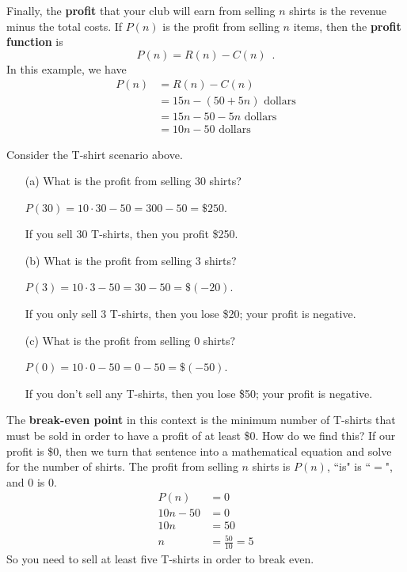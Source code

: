 Finally, the {\bf profit} that your club will earn from selling $n$ shirts is the revenue minus the total costs. If $P(n)$ is the profit from selling $n$ items, then the {\bf profit function} is
$$P(n) = R(n) - C(n) \enspace .$$
In this example, we have
\begin{align*}
P(n) &= R(n) - C(n)\\
&= 15n - (50 + 5n) \mbox{ dollars}\\
&= 15n - 50 - 5n \mbox{ dollars}\\
&= 10n - 50 \mbox{ dollars}
\end{align*}
\begin{example}
Consider the T-shirt scenario above.
    \begin{itemize}
        \item[(a)] What is the profit from selling 30 shirts?

        \begin{solution} $P(30) = 10\cdot 30 - 50 = 300 - 50 = \$250$.

        If you sell 30 T-shirts, then you profit \$250.
        \end{solution}

        \item[(b)] What is the profit from selling 3 shirts?

        \begin{solution} $P(3) = 10\cdot 3 - 50 = 30-50 = \$(-20)$.

        If you only sell 3 T-shirts, then you lose \$20; your profit is negative.
        \end{solution}
        \item[(c)] What is the profit from selling 0 shirts?

        \begin{solution} $P(0) = 10\cdot 0 - 50 = 0-50 = \$(-50)$.

        If you don't sell any T-shirts, then you lose \$50; your profit is negative.
        \end{solution}
    \end{itemize}
\end{example}
The {\bf break-even point} in this context is the minimum number of T-shirts that must be sold in order to have a profit of at least \$0. How do we find this? If our profit is \$0, then we turn that sentence into a mathematical equation and solve for the number of shirts. The profit from selling $n$ shirts is $P(n)$, ``is" is ``$=$", and $0$ is $0$.
\begin{align*}
P(n) &= 0 \\
10n-50 &= 0\\
10n &= 50 \\
n &= \frac{50}{10} = 5
\end{align*}
So you need to sell at least five T-shirts in order to break even.


